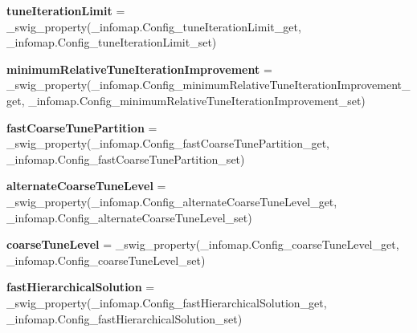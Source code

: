 \begin{DoxyCompactItemize}
\item 
\mbox{\label{classdsmacc_1_1graph_1_1infomap_1_1infomap_1_1Config_ae64eef4ab00019a41b47b3e8558839d2}} 
{\bfseries tune\+Iteration\+Limit} = \+\_\+swig\+\_\+property(\+\_\+infomap.\+Config\+\_\+tune\+Iteration\+Limit\+\_\+get, \+\_\+infomap.\+Config\+\_\+tune\+Iteration\+Limit\+\_\+set)
\item 
\mbox{\label{classdsmacc_1_1graph_1_1infomap_1_1infomap_1_1Config_aaddd205e984782b0f529e40663af8c64}} 
{\bfseries minimum\+Relative\+Tune\+Iteration\+Improvement} = \+\_\+swig\+\_\+property(\+\_\+infomap.\+Config\+\_\+minimum\+Relative\+Tune\+Iteration\+Improvement\+\_\+get, \+\_\+infomap.\+Config\+\_\+minimum\+Relative\+Tune\+Iteration\+Improvement\+\_\+set)
\item 
\mbox{\label{classdsmacc_1_1graph_1_1infomap_1_1infomap_1_1Config_a88b5b54c7977d1eef3d1021897988a9d}} 
{\bfseries fast\+Coarse\+Tune\+Partition} = \+\_\+swig\+\_\+property(\+\_\+infomap.\+Config\+\_\+fast\+Coarse\+Tune\+Partition\+\_\+get, \+\_\+infomap.\+Config\+\_\+fast\+Coarse\+Tune\+Partition\+\_\+set)
\item 
\mbox{\label{classdsmacc_1_1graph_1_1infomap_1_1infomap_1_1Config_a87f281e7e991a7c66e78ddd443fc94e5}} 
{\bfseries alternate\+Coarse\+Tune\+Level} = \+\_\+swig\+\_\+property(\+\_\+infomap.\+Config\+\_\+alternate\+Coarse\+Tune\+Level\+\_\+get, \+\_\+infomap.\+Config\+\_\+alternate\+Coarse\+Tune\+Level\+\_\+set)
\item 
\mbox{\label{classdsmacc_1_1graph_1_1infomap_1_1infomap_1_1Config_a455b469eabfa6bd4f7e5c9f979b19096}} 
{\bfseries coarse\+Tune\+Level} = \+\_\+swig\+\_\+property(\+\_\+infomap.\+Config\+\_\+coarse\+Tune\+Level\+\_\+get, \+\_\+infomap.\+Config\+\_\+coarse\+Tune\+Level\+\_\+set)
\item 
\mbox{\label{classdsmacc_1_1graph_1_1infomap_1_1infomap_1_1Config_a7dcd0cf30dc46a2441f8913f6d527e34}} 
{\bfseries fast\+Hierarchical\+Solution} = \+\_\+swig\+\_\+property(\+\_\+infomap.\+Config\+\_\+fast\+Hierarchical\+Solution\+\_\+get, \+\_\+infomap.\+Config\+\_\+fast\+Hierarchical\+Solution\+\_\+set)

\end{DoxyCompactItemize}
